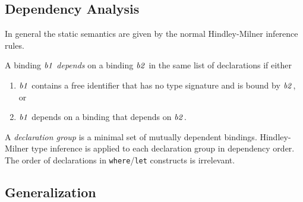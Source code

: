 \subsection{Dependency Analysis}
\label{depend-anal}

In general the static semantics are given by  the
normal Hindley-Milner inference
rules.  

\begin{haskellprime}

A binding \mbox{$\it b1$} \emph{depends} on a binding \mbox{$\it b2$} in the same list of
declarations if either

\begin{enumerate}
\item \mbox{$\it b1$} contains a free identifier that has no type signature and
is bound by \mbox{$\it b2$}, or
\item \mbox{$\it b1$} depends on a binding that depends on \mbox{$\it b2$}.
\end{enumerate}

A \emph{declaration group} is a minimal set of mutually dependent
bindings. Hindley-Milner type inference is applied to each declaration
group in dependency order. The order of declarations in \mbox{\tt where}/\mbox{\tt let}
constructs is irrelevant.

\end{haskellprime}

% 


\subsection{Generalization}
\label{generalization}

